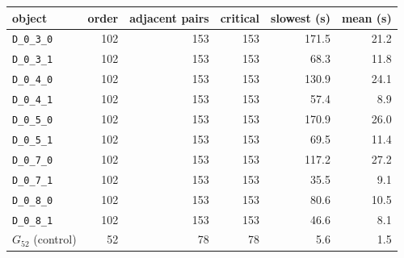 \begin{tabular}{lrrrrr}
\toprule
object & order & adjacent pairs & critical & slowest (s) & mean (s)\\
\midrule
\texttt{D\_0\_3\_0} & 102 & 153 & 153 & 171.5 & 21.2\\
\texttt{D\_0\_3\_1} & 102 & 153 & 153 & 68.3 & 11.8\\
\texttt{D\_0\_4\_0} & 102 & 153 & 153 & 130.9 & 24.1\\
\texttt{D\_0\_4\_1} & 102 & 153 & 153 & 57.4 & 8.9\\
\texttt{D\_0\_5\_0} & 102 & 153 & 153 & 170.9 & 26.0\\
\texttt{D\_0\_5\_1} & 102 & 153 & 153 & 69.5 & 11.4\\
\texttt{D\_0\_7\_0} & 102 & 153 & 153 & 117.2 & 27.2\\
\texttt{D\_0\_7\_1} & 102 & 153 & 153 & 35.5 & 9.1\\
\texttt{D\_0\_8\_0} & 102 & 153 & 153 & 80.6 & 10.5\\
\texttt{D\_0\_8\_1} & 102 & 153 & 153 & 46.6 & 8.1\\
$G_{52}$ (control) & 52 & 78 & 78 & 5.6 & 1.5\\
\bottomrule
\end{tabular}
